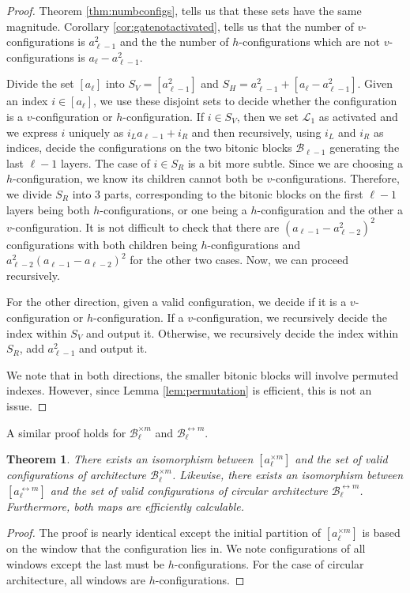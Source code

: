 \documentclass[11pt,letterpaper]{article}
\newtheorem{theorem}{Theorem}[section]
\theoremstyle{definition}
\theoremstyle{remark}
\newcommand{\cB}{\mathcal B}
\newcommand{\cL}{\mathcal L}
\numberwithin{equation}{section}
\theoremstyle{definition}
\begin{document}
\begin{proof}
Theorem \ref{thm:numbconfigs}, tells us that these sets have the same magnitude. Corollary \ref{cor:gatenotactivated}, tells us that the number of $v$-configurations is $a_{\ell - 1}^2$ and the the number of $h$-configurations which are not $v$-configurations is $a_\ell - a_{\ell - 1}^2$.

Divide the set $[a_\ell]$ into $S_V =[a_{\ell-1}^2]$ and $S_H = a_{\ell-1}^2 + [a_\ell - a_{\ell - 1}^2]$. Given an index $i \in [a_\ell]$, we use these disjoint sets to decide whether the configuration is a $v$-configuration or $h$-configuration. If $i \in S_V$, then we set $\cL_1$ as activated and we express $i$ uniquely as $i_L a_{\ell - 1} + i_R$ and then recursively, using $i_L$ and $i_R$ as indices, decide the configurations on the two bitonic blocks $\cB_{\ell - 1}$ generating the last $\ell - 1$ layers. The case of $i \in S_R$ is a bit more subtle. Since we are choosing a $h$-configuration, we know its children cannot both be $v$-configurations. Therefore, we divide $S_R$ into 3 parts, corresponding to the bitonic blocks on the first $\ell - 1$ layers being both $h$-configurations, or one being a $h$-configuration and the other a $v$-configuration. It is not difficult to check that there are $(a_{\ell-1} - a_{\ell-2}^2)^2$ configurations with both children being $h$-configurations and $a_{\ell-2}^2(a_{\ell-1} - a_{\ell-2})^2$ for the other two cases. Now, we can proceed recursively.

For the other direction, given a valid configuration, we decide if it is a $v$-configuration or $h$-configuration. If a $v$-configuration, we recursively decide the index within $S_V$ and output it. Otherwise, we recursively decide the index within $S_R$, add $a_{\ell - 1}^2$ and output it.

We note that in both directions, the smaller bitonic blocks will involve permuted indexes. However, since Lemma \ref{lem:permutation} is efficient, this is not an issue.
\end{proof}

A similar proof holds for $\cB_{\ell}^{\times m}$ and $\cB_{\ell}^{\leftrightarrow m}$.

\begin{theorem}
There exists an isomorphism between $[a_\ell^{\times m}]$ and the set of valid configurations of architecture $\cB_{\ell}^{\times m}$. Likewise, there exists an isomorphism between $[a_\ell^{\leftrightarrow m}]$ and the set of valid configurations of circular architecture $\cB_{\ell}^{\leftrightarrow m}$. Furthermore, both maps are efficiently calculable.
\label{thm:efficientindex}
\end{theorem}

\begin{proof}
The proof is nearly identical except the initial partition of $[a_\ell^{\times m}]$ is based on the window that the configuration lies in. We note configurations of all windows except the last must be $h$-configurations. For the case of circular architecture, all windows are $h$-configurations.
\end{proof}
\end{document}
